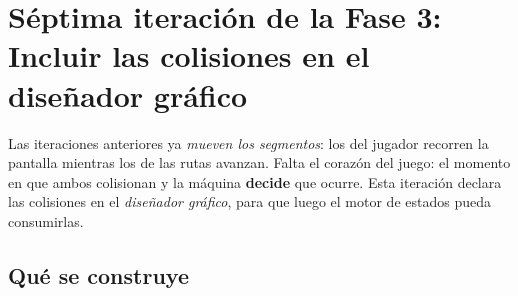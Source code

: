 \section{Séptima iteración de la Fase 3: Incluir las colisiones en el diseñador gráfico}
\label{sec:ColisionesDisenador}

Las iteraciones anteriores ya \emph{mueven los segmentos}: los del jugador recorren la pantalla mientras los de las rutas avanzan. Falta el corazón del juego: el
momento en que ambos colisionan y la máquina \textbf{decide} que ocurre. Esta iteración declara las colisiones en el \emph{diseñador gráfico}, para que luego el motor de estados pueda consumirlas.

\subsection{Qué se construye}
\label{subsec:QueSeConstruyeF3I7}

